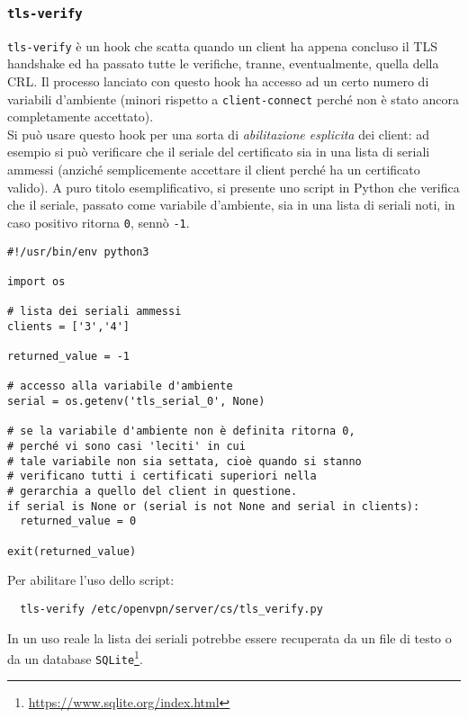 \subsubsection{\texttt{tls-verify}}
\texttt{tls-verify} è un hook che scatta quando un client ha appena concluso il TLS
handshake ed ha passato tutte le verifiche, tranne, eventualmente, quella della CRL.
Il processo lanciato con questo hook ha accesso ad un certo numero di variabili d'ambiente
(minori rispetto a \texttt{client-connect} perché non è stato ancora completamente
accettato). \\
Si può usare questo hook per una sorta di \textit{abilitazione esplicita} dei client:
ad esempio si può verificare che il seriale del certificato sia
in una lista di seriali ammessi (anziché semplicemente accettare il client perché
ha un certificato valido).
A puro titolo esemplificativo, si presente uno script in Python che
verifica che il seriale, passato come variabile d'ambiente, sia in una lista di seriali noti,
in caso positivo ritorna \texttt{0}, sennò \texttt{-1}.
\begin{verbatim}
#!/usr/bin/env python3

import os

# lista dei seriali ammessi
clients = ['3','4']
  
returned_value = -1

# accesso alla variabile d'ambiente
serial = os.getenv('tls_serial_0', None)

# se la variabile d'ambiente non è definita ritorna 0,
# perché vi sono casi 'leciti' in cui
# tale variabile non sia settata, cioè quando si stanno
# verificano tutti i certificati superiori nella
# gerarchia a quello del client in questione.
if serial is None or (serial is not None and serial in clients):
  returned_value = 0
  
exit(returned_value)   
\end{verbatim}
Per abilitare l'uso dello script:
\begin{verbatim}
  tls-verify /etc/openvpn/server/cs/tls_verify.py
\end{verbatim}
In un uso reale la lista dei seriali potrebbe essere recuperata da un file di testo
o da un database \texttt{SQLite}\footnote{\url{https://www.sqlite.org/index.html}}.

